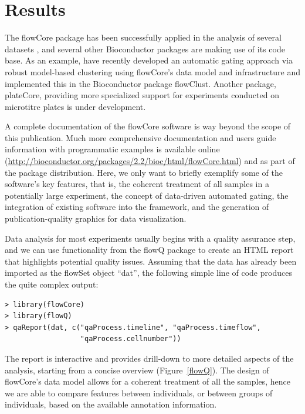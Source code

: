\documentclass[12pt]{article}
\begin{document}
\section*{Results}
The flowCore package has been successfully applied in the analysis of
several datasets \citep{gasparetto2004ice,brinkman2007hcf}, and
several other Bioconductor packages are making use of its code
base. As an example, \cite{lo2008agf} have recently developed an
automatic gating approach via robust model-based clustering using
flowCore's data model and infrastructure and implemented this in the
Bioconductor package flowClust. Another package, plateCore, providing
more specialized support for experiments conducted on microtitre
plates is under development.

A complete documentation of the flowCore software is way beyond the
scope of this publication. Much more comprehensive documentation and
users guide information with programmatic examples is available online
(\url{http://bioconductor.org/packages/2.2/bioc/html/flowCore.html})
and as part of the package distribution. Here, we only want to briefly
exemplify some of the software's key features, that is, the coherent
treatment of all samples in a potentially large experiment, the
concept of data-driven automated gating, the integration of existing
software into the framework, and the generation of publication-quality
graphics for data visualization.

Data analysis for most experiments usually begins with a quality
assurance step, and we can use functionality from the flowQ package to
create an HTML report that highlights potential quality
issues. Assuming that the data has already been imported as the
flowSet object ``dat'', the following simple line of code produces the
quite complex output:

\begin{verbatim}
> library(flowCore)
> library(flowQ)
> qaReport(dat, c("qaProcess.timeline", "qaProcess.timeflow", 
                  "qaProcess.cellnumber"))
\end{verbatim}

The report is interactive and provides drill-down to more detailed
aspects of the analysis, starting from a concise overview
(Figure~\ref{flowQ}). The design of flowCore's data model allows for a
coherent treatment of all the samples, hence we are able to compare
features between individuals, or between groups of individuals, based
on the available annotation information.
\end{document}
